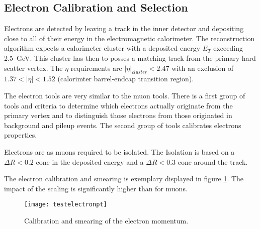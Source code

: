 \subsection{Electron Calibration and Selection}


Electrons are detected by leaving a track in the inner detector and depositing close to all of their energy in the electromagnetic calorimeter. The reconstruction algorithm expects a calorimeter cluster with a deposited energy $E_T$ exceeding \SI{2.5}{\GeV}. This cluster has then to posses a matching track from the primary hard scatter vertex. The $\eta$ requirements are $|\eta|_{cluster} < 2.47$ with an exclusion of $\num{1.37} < |\eta| < \num{1.52}$ (calorimter barrel-endcap transition region).


The electron tools are very similar to the muon tools. There is a first group of tools and criteria to determine which electrons actually originate from the primary vertex and to distinguish those electrons from those originated in background and pileup events. The second group of tools calibrates electrons properties.

Electrons are as muons required to be isolated. The Isolation is based on a $\Delta R < \num{0.2}$ cone in the deposited energy and a $\Delta R < \num{0.3}$ cone around the track.

The electron calibration and smearing is exemplary displayed in figure \ref{fig:testelectronpt}. The impact of the scaling is significantly higher than for muons.

\begin{figure}
\centering
\texttt{[image: testelectronpt]}
\caption[Calibration and Smearing of the electron momentum]{Calibration and smearing of the electron momentum.}
\label{fig:testelectronpt}
\end{figure}